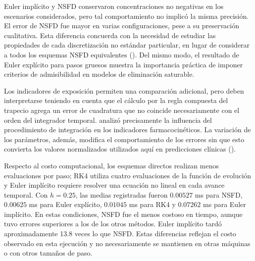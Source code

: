 \documentclass[11pt,final,5p,times,twocolumn,authoryear]{elsarticle}
\begin{document}
Euler implícito y NSFD conservaron concentraciones no negativas en los escenarios considerados, pero tal comportamiento no implicó la misma precisión. El error de NSFD fue mayor en varias configuraciones, pese a su preservación cualitativa. Esta diferencia concuerda con la necesidad de estudiar las propiedades de cada discretización no estándar particular, en lugar de considerar a todos los esquemas NSFD equivalentes (\citealp{mickens2002,egbelowo2018}). Del mismo modo, el resultado de Euler explícito para pasos gruesos muestra la importancia práctica de imponer criterios de admisibilidad en modelos de eliminación saturable.

Los indicadores de exposición permiten una comparación adicional, pero deben interpretarse teniendo en cuenta que el cálculo por la regla compuesta del trapecio agrega un error de cuadratura que no coincide necesariamente con el orden del integrador temporal. \citet{purves1992} analizó precisamente la influencia del procedimiento de integración en los indicadores farmacocinéticos. La variación de los parámetros, además, modifica el comportamiento de los errores sin que esto convierta los valores normalizados utilizados aquí en predicciones clínicas (\citealp{tang2007,wagner1973}).

Respecto al costo computacional, los esquemas directos realizan menos evaluaciones por paso; RK4 utiliza cuatro evaluaciones de la función de evolución y Euler implícito requiere resolver una ecuación no lineal en cada avance temporal. Con $h=0.25$, las medias registradas fueron $0.00527$ ms para NSFD, $0.00625$ ms para Euler explícito, $0.01045$ ms para RK4 y $0.07262$ ms para Euler implícito. En estas condiciones, NSFD fue el menos costoso en tiempo, aunque tuvo errores superiores a los de los otros métodos. Euler implícito tardó aproximadamente 13.8 veces lo que NSFD. Estas diferencias reflejan el costo observado en esta ejecución y no necesariamente se mantienen en otras máquinas o con otros tamaños de paso.
\end{document}
